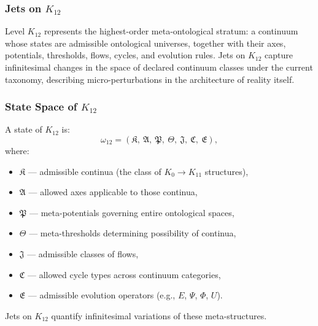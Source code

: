 
\subsubsection{Jets on $K_{12}$}
\label{sec:jets-k12}

Level $K_{12}$ represents the highest-order meta-ontological stratum:
a continuum whose states are admissible ontological universes,
together with their axes, potentials, thresholds, flows, cycles, and
evolution rules. Jets on $K_{12}$ capture infinitesimal changes in the
space of declared continuum classes under the current taxonomy, describing micro-perturbations in the
architecture of reality itself.


\subsubsection{State Space of $K_{12}$}

A state of $K_{12}$ is:
\[
\omega_{12} =
(\mathfrak{K},\ \mathfrak{A},\ \mathfrak{P},\ \mathfrak{\Theta},\
 \mathfrak{J},\ \mathfrak{C},\ \mathfrak{E}),
\]
where:
\begin{itemize}
    \item $\mathfrak{K}$ — admissible continua (the class of $K_0\!\to\!K_{11}$ structures),
    \item $\mathfrak{A}$ — allowed axes applicable to those continua,
    \item $\mathfrak{P}$ — meta-potentials governing entire ontological spaces,
    \item $\mathfrak{\Theta}$ — meta-thresholds determining possibility of continua,
    \item $\mathfrak{J}$ — admissible classes of flows,
    \item $\mathfrak{C}$ — allowed cycle types across continuum categories,
    \item $\mathfrak{E}$ — admissible evolution operators (e.g., $E$, $\Psi$, $\Phi$, $U$).
\end{itemize}

Jets on $K_{12}$ quantify infinitesimal variations of these meta-structures.


